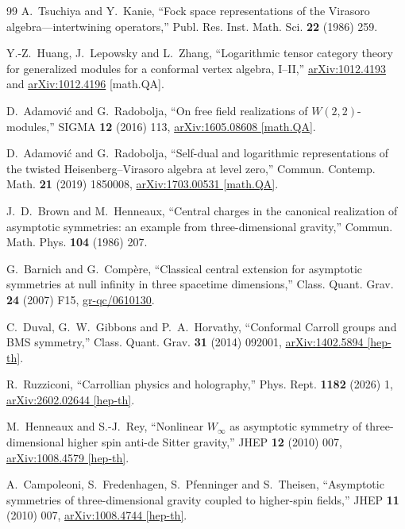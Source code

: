 \documentclass[11pt,a4paper]{article}
\numberwithin{equation}{section}
\theoremstyle{remark}
\begin{document}
\begin{thebibliography}{99}
A.~Tsuchiya and Y.~Kanie,
``Fock space representations of the Virasoro algebra---intertwining operators,''
Publ. Res. Inst. Math. Sci. \textbf{22} (1986) 259.

Y.-Z.~Huang, J.~Lepowsky and L.~Zhang,
``Logarithmic tensor category theory for generalized modules for a conformal vertex algebra,
I--II,''
\href{https://arxiv.org/abs/1012.4193}{arXiv:1012.4193} and
\href{https://arxiv.org/abs/1012.4196}{arXiv:1012.4196} [math.QA].

D.~Adamovi\'c and G.~Radobolja,
``On free field realizations of $W(2,2)$-modules,''
SIGMA \textbf{12} (2016) 113,
\href{https://arxiv.org/abs/1605.08608}{arXiv:1605.08608 [math.QA]}.

D.~Adamovi\'c and G.~Radobolja,
``Self-dual and logarithmic representations of the twisted Heisenberg--Virasoro algebra at
level zero,''
Commun. Contemp. Math. \textbf{21} (2019) 1850008,
\href{https://arxiv.org/abs/1703.00531}{arXiv:1703.00531 [math.QA]}.

J.~D.~Brown and M.~Henneaux,
``Central charges in the canonical realization of asymptotic symmetries: an example from
three-dimensional gravity,''
Commun. Math. Phys. \textbf{104} (1986) 207.

G.~Barnich and G.~Comp\`ere,
``Classical central extension for asymptotic symmetries at null infinity in three spacetime
dimensions,''
Class. Quant. Grav. \textbf{24} (2007) F15,
\href{https://arxiv.org/abs/gr-qc/0610130}{gr-qc/0610130}.

C.~Duval, G.~W.~Gibbons and P.~A.~Horvathy,
``Conformal Carroll groups and BMS symmetry,''
Class. Quant. Grav. \textbf{31} (2014) 092001,
\href{https://arxiv.org/abs/1402.5894}{arXiv:1402.5894 [hep-th]}.

R.~Ruzziconi,
``Carrollian physics and holography,''
Phys. Rept. \textbf{1182} (2026) 1,
\href{https://arxiv.org/abs/2602.02644}{arXiv:2602.02644 [hep-th]}.

M.~Henneaux and S.-J.~Rey,
``Nonlinear $W_\infty$ as asymptotic symmetry of three-dimensional higher spin anti-de
Sitter gravity,''
JHEP \textbf{12} (2010) 007,
\href{https://arxiv.org/abs/1008.4579}{arXiv:1008.4579 [hep-th]}.

A.~Campoleoni, S.~Fredenhagen, S.~Pfenninger and S.~Theisen,
``Asymptotic symmetries of three-dimensional gravity coupled to higher-spin fields,''
JHEP \textbf{11} (2010) 007,
\href{https://arxiv.org/abs/1008.4744}{arXiv:1008.4744 [hep-th]}.


\end{thebibliography}
\end{document}
